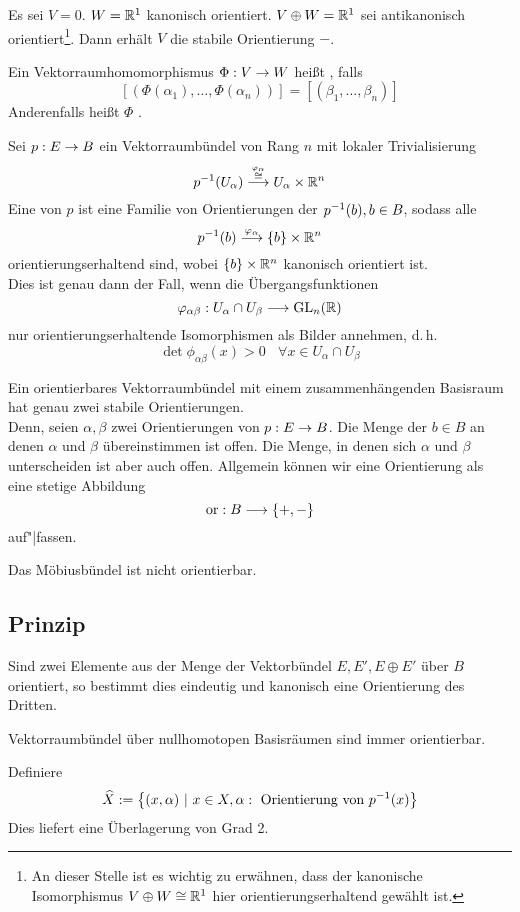 \Bsp{}
Es sei $V = 0$. $W = \mathbb{R}^1$ kanonisch orientiert. $V\oplus W = \mathbb{R}^1$ sei antikanonisch orientiert\footnote{An dieser Stelle ist es wichtig zu erwähnen, dass der kanonische Isomorphismus $V\oplus W \overset{}{\cong} \mathbb{R}^1 $ hier orientierungserhaltend gewählt ist.}. Dann erhält $V$ die stabile Orientierung $-$.

\Def{}
Ein Vektorraumhomomorphismus $\Phi : V \overset{}{\rightarrow} W$ heißt , falls
\[ [ (\Phi(\alpha_1), \ldots, \Phi(\alpha_n) )] = [ (\beta_1, \ldots, \beta_n)] \]
Anderenfalls heißt $\Phi$ .

\Def{}
Sei $p : E \overset{}{\rightarrow} B$ ein Vektorraumbündel von Rang $n$ mit lokaler Trivialisierung
\[p^{-1} (U_\alpha) \overset{\overset{\varphi_\alpha}{\cong} }{\longrightarrow} U_\alpha \times \mathbb{R}^n\]
Eine  von $p$ ist eine Familie von Orientierungen der $p^{-1}(b), b\in B$, sodass alle
\[ p^{-1}(b) \overset{ \varphi_\alpha }{\longrightarrow} \{b\} \times \mathbb{R}^n  \]
orientierungserhaltend sind, wobei $\{b\} \times \mathbb{R}^n$ kanonisch orientiert ist.\\
Dies ist genau dann der Fall, wenn die Übergangsfunktionen
\[ \varphi_{\alpha \beta} : U_\alpha \cap U_\beta \overset{}{\longrightarrow} \text{GL}_n(\mathbb{R}) \]
nur orientierungserhaltende Isomorphismen als Bilder annehmen, d.\,h.
\[ \det \phi_{\alpha \beta}(x) > 0 ~~~~\forall x \in U_\alpha \cap U_\beta \]

\Bem{}
Ein orientierbares Vektorraumbündel mit einem zusammenhängenden Basisraum hat genau zwei stabile Orientierungen.\\
Denn, seien $\alpha, \beta$ zwei Orientierungen von $p : E \overset{}{\rightarrow} B$. Die Menge der $b \in B$ an denen $\alpha$ und $\beta$ übereinstimmen ist offen. Die Menge, in denen sich $\alpha$ und $\beta$ unterscheiden ist aber auch offen. Allgemein können wir eine Orientierung als eine stetige Abbildung
\[ \text{or} : B \overset{}{\longrightarrow} \{+, -\} \]
auf"|fassen.

\Bsp{}
Das Möbiusbündel ist nicht orientierbar.

\subsection{Prinzip}
Sind zwei Elemente aus der Menge der Vektorbündel ${E, E', E\oplus E'}$ über $B$ orientiert, so bestimmt dies eindeutig und kanonisch eine Orientierung des Dritten.

\Bem{}
Vektorraumbündel über nullhomotopen Basisräumen sind immer orientierbar.
\begin{Beweis}{}
Definiere
\[ \widehat{X} := \set{(x, \alpha)}{x \in X, \alpha : \text{ Orientierung von }p\i(x)} \]
Dies liefert eine Überlagerung von Grad 2.
\end{Beweis}

